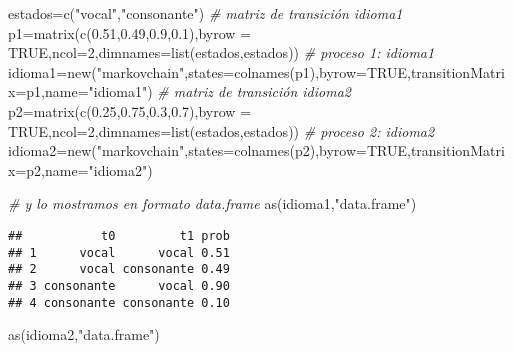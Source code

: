 \documentclass[
]{book}
\newenvironment{Shaded}{\begin{snugshade}}{\end{snugshade}}
\newcommand{\AttributeTok}[1]{\textcolor[rgb]{0.77,0.63,0.00}{#1}}
\newcommand{\CommentTok}[1]{\textcolor[rgb]{0.56,0.35,0.01}{\textit{#1}}}
\newcommand{\ConstantTok}[1]{\textcolor[rgb]{0.00,0.00,0.00}{#1}}
\newcommand{\DecValTok}[1]{\textcolor[rgb]{0.00,0.00,0.81}{#1}}
\newcommand{\FloatTok}[1]{\textcolor[rgb]{0.00,0.00,0.81}{#1}}
\newcommand{\FunctionTok}[1]{\textcolor[rgb]{0.00,0.00,0.00}{#1}}
\newcommand{\NormalTok}[1]{#1}
\newcommand{\OtherTok}[1]{\textcolor[rgb]{0.56,0.35,0.01}{#1}}
\newcommand{\StringTok}[1]{\textcolor[rgb]{0.31,0.60,0.02}{#1}}
\theoremstyle{definition}
\theoremstyle{definition}
\theoremstyle{definition}
\theoremstyle{definition}
\theoremstyle{remark}
\begin{document}
\begin{Shaded}
\begin{Highlighting}[]
\NormalTok{estados}\OtherTok{=}\FunctionTok{c}\NormalTok{(}\StringTok{"vocal"}\NormalTok{,}\StringTok{"consonante"}\NormalTok{)}
\CommentTok{\# matriz de transición idioma1}
\NormalTok{p1}\OtherTok{=}\FunctionTok{matrix}\NormalTok{(}\FunctionTok{c}\NormalTok{(}\FloatTok{0.51}\NormalTok{,}\FloatTok{0.49}\NormalTok{,}\FloatTok{0.9}\NormalTok{,}\FloatTok{0.1}\NormalTok{),}\AttributeTok{byrow =} \ConstantTok{TRUE}\NormalTok{,}\AttributeTok{ncol=}\DecValTok{2}\NormalTok{,}\AttributeTok{dimnames=}\FunctionTok{list}\NormalTok{(estados,estados))}
\CommentTok{\# proceso 1: idioma1}
\NormalTok{idioma1}\OtherTok{=}\FunctionTok{new}\NormalTok{(}\StringTok{"markovchain"}\NormalTok{,}\AttributeTok{states=}\FunctionTok{colnames}\NormalTok{(p1),}\AttributeTok{byrow=}\ConstantTok{TRUE}\NormalTok{,}\AttributeTok{transitionMatrix=}\NormalTok{p1,}\AttributeTok{name=}\StringTok{"idioma1"}\NormalTok{)}
\CommentTok{\# matriz de transición idioma2}
\NormalTok{p2}\OtherTok{=}\FunctionTok{matrix}\NormalTok{(}\FunctionTok{c}\NormalTok{(}\FloatTok{0.25}\NormalTok{,}\FloatTok{0.75}\NormalTok{,}\FloatTok{0.3}\NormalTok{,}\FloatTok{0.7}\NormalTok{),}\AttributeTok{byrow =} \ConstantTok{TRUE}\NormalTok{,}\AttributeTok{ncol=}\DecValTok{2}\NormalTok{,}\AttributeTok{dimnames=}\FunctionTok{list}\NormalTok{(estados,estados))}
\CommentTok{\# proceso 2: idioma2}
\NormalTok{idioma2}\OtherTok{=}\FunctionTok{new}\NormalTok{(}\StringTok{"markovchain"}\NormalTok{,}\AttributeTok{states=}\FunctionTok{colnames}\NormalTok{(p2),}\AttributeTok{byrow=}\ConstantTok{TRUE}\NormalTok{,}\AttributeTok{transitionMatrix=}\NormalTok{p2,}\AttributeTok{name=}\StringTok{"idioma2"}\NormalTok{)}

\CommentTok{\# y lo mostramos en formato data.frame}
\FunctionTok{as}\NormalTok{(idioma1,}\StringTok{"data.frame"}\NormalTok{)}
\end{Highlighting}
\end{Shaded}

\begin{verbatim}
##           t0         t1 prob
## 1      vocal      vocal 0.51
## 2      vocal consonante 0.49
## 3 consonante      vocal 0.90
## 4 consonante consonante 0.10
\end{verbatim}

\begin{Shaded}
\begin{Highlighting}[]
\FunctionTok{as}\NormalTok{(idioma2,}\StringTok{"data.frame"}\NormalTok{)}
\end{Highlighting}
\end{Shaded}
\end{document}
